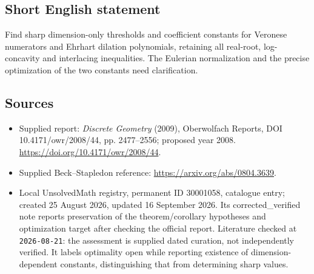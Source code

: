\documentclass[11pt]{article}
\begin{document}
\subsection{Short English statement}
Find sharp dimension-only thresholds and coefficient constants for Veronese numerators and Ehrhart dilation polynomials, retaining all real-root, log-concavity and interlacing inequalities. The Eulerian normalization and the precise optimization of the two constants need clarification.
\subsection{Sources}
\begin{itemize}
\item Supplied report: \emph{Discrete Geometry} (2009), Oberwolfach Reports, DOI 10.4171/owr/2008/44, pp. 2477--2556; proposed year 2008. \url{https://doi.org/10.4171/owr/2008/44}.
\item Supplied Beck--Stapledon reference: \url{https://arxiv.org/abs/0804.3639}.
\item Local UnsolvedMath registry, permanent ID 30001058, catalogue entry; created 25 August 2026, updated 16 September 2026. Its corrected\_verified note reports preservation of the theorem/corollary hypotheses and optimization target after checking the official report. Literature checked at \texttt{2026-08-21}: the assessment is supplied dated curation, not independently verified. It labels optimality open while reporting existence of dimension-dependent constants, distinguishing that from determining sharp values.
\end{itemize}
\end{document}
